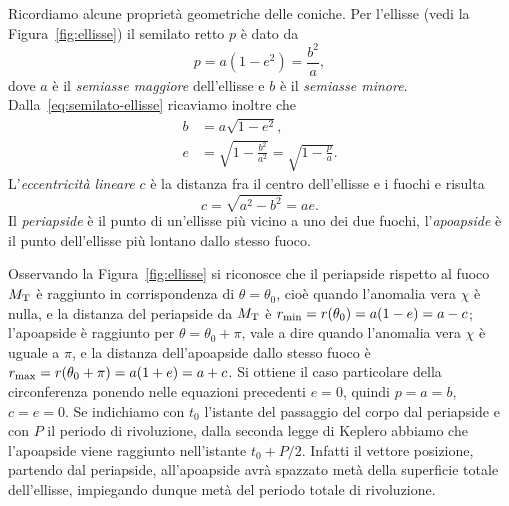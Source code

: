 Ricordiamo alcune proprietà geometriche delle coniche. Per l'ellisse (vedi la
Figura~\ref{fig:ellisse}) il semilato retto $p$ è dato da
\begin{equation}
  \label{eq:semilato-ellisse}
  p = a(1-e^2) = \frac{b^2}{a},
\end{equation}
dove $a$ è il \emph{semiasse maggiore} dell'ellisse e $b$ è il \emph{semiasse
  minore}. Dalla~\eqref{eq:semilato-ellisse} ricaviamo inoltre che
\begin{align}
  b &= a\sqrt{1-e^2}, \label{eq:semiasse-minore-ellisse}\\
  e &= \sqrt{1-\frac{b^2}{a^2}} =
  \sqrt{1-\frac{p}{a}}. \label{eq:eccentricita-ellisse}
\end{align}
L'\emph{eccentricità lineare} $c$ è la distanza fra il centro dell'ellisse e i
fuochi e risulta
\begin{equation}
  c=\sqrt{a^2-b^2} = ae.
\end{equation}
Il \emph{periapside} è il punto di un'ellisse più vicino a uno dei due fuochi,
l'\emph{apoapside} è il punto dell'ellisse più lontano dallo stesso fuoco.

Osservando la Figura~\ref{fig:ellisse} si riconosce che il periapside rispetto
al fuoco $M_\textup{T}$ è raggiunto in corrispondenza di $\theta=\theta_0$, cioè
quando l'anomalia vera $\chi$ è nulla, e la distanza del periapside da
$M_\textup{T}$ è $r_\textup{min} = r(\theta_0) = a(1-e) = a-c$; l'apoapside è
raggiunto per $\theta=\theta_0+\pi$, vale a dire quando l'anomalia vera $\chi$ è
uguale a $\pi$, e la distanza dell'apoapside dallo stesso fuoco è
$r_\textup{max} = r(\theta_0+\pi) = a(1+e)= a+c$. Si ottiene il caso particolare
della circonferenza ponendo nelle equazioni precedenti $e=0$, quindi $p=a=b$,
$c=e=0$. Se indichiamo con $t_0$ l'istante del passaggio del corpo dal
periapside e con $P$ il periodo di rivoluzione, dalla seconda legge di Keplero
abbiamo che l'apoapside viene raggiunto nell'istante $t_0 + P/2$. Infatti il
vettore posizione, partendo dal periapside, all'apoapside avrà spazzato metà
della superficie totale dell'ellisse, impiegando dunque metà del periodo totale
di rivoluzione.

